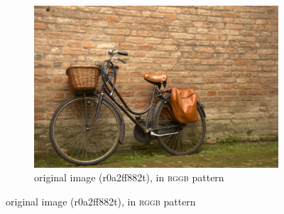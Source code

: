 \documentclass{ipol}
\begin{document}
\begin{figure}[ht]
\centering
\begin{subfigure}[c]{.6\linewidth}
\includegraphics[width=\linewidth]{images/original/r0a2ff882t.jpeg}
\caption{original image (r0a2ff882t), in \textsc{rggb} pattern}
\end{subfigure}


\end{figure}
\end{document}
